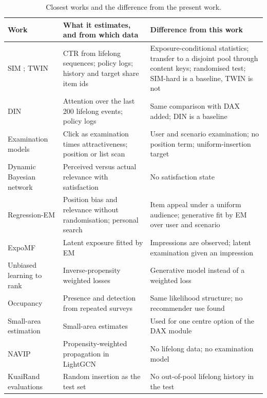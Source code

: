 \documentclass[preprint,12pt,authoryear]{elsarticle}
\begin{document}
\begin{table}[tbp]
\caption{Closest works and the difference from the present work.}
\label{tab:positioning}
\centering
\footnotesize
\raggedright
\begin{tabular}{p{3.4cm}p{4.2cm}p{5.4cm}}
\toprule
Work & What it estimates, and from which data & Difference from this work \\
\midrule
SIM \citep{pi2020sim}; TWIN \citep{chang2023twin} & CTR from lifelong sequences; policy logs; history and target share item ids & Exposure-conditional statistics; transfer to a disjoint pool through content keys; randomised test; SIM-hard is a baseline, TWIN is not \\
DIN \citep{zhou2018din} & Attention over the last 200 lifelong events; policy logs & Same comparison with DAX added; DIN is a baseline \\
Examination models \citep{richardson2007predicting,craswell2008cascade,chuklin2015clickmodels} & Click as examination times attractiveness; position or list scan & User and scenario examination; no position term; uniform-insertion target \\
Dynamic Bayesian network \citep{chapelle2009dbn} & Perceived versus actual relevance with satisfaction & No satisfaction state \\
Regression-EM \citep{wang2018regressionem,wang2016selection} & Position bias and relevance without randomisation; personal search & Item appeal under a uniform audience; generative fit by EM over user and scenario \\
ExpoMF \citep{liang2016exposure} & Latent exposure fitted by EM & Impressions are observed; latent examination given an impression \\
Unbiased learning to rank \citep{joachims2017unbiased} & Inverse-propensity weighted losses & Generative model instead of a weighted loss \\
Occupancy \citep{mackenzie2002occupancy} & Presence and detection from repeated surveys & Same likelihood structure; no recommender use found \\
Small-area estimation \citep{fay1979smallarea} & Small-area estimates & Used for one centre option of the DAX module \\
NAVIP \citep{kim2022navip} & Propensity-weighted propagation in LightGCN & No lifelong data; no examination model \\
KuaiRand evaluations \citep{gao2022kuairand,zhang2026categorymeans} & Random insertion as the test set & No out-of-pool lifelong history in the test \\
\bottomrule
\end{tabular}
\end{table}
\end{document}
